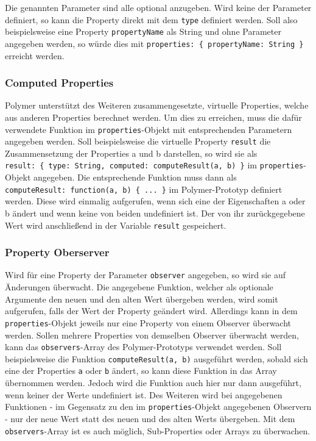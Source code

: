 \documentclass[]{article}
\begin{document}
Die genannten Parameter sind alle optional anzugeben. Wird keine der
Parameter definiert, so kann die Property direkt mit dem \texttt{type}
definiert werden. Soll also beispielsweise eine Property
\texttt{propertyName} als String und ohne Parameter angegeben werden, so
würde dies mit \texttt{properties:\ \{\ propertyName:\ String\ \}}
erreicht werden.

\subsubsection{Computed Properties}\label{computed-properties}

Polymer unterstützt des Weiteren zusammengesetzte, virtuelle Properties,
welche aus anderen Properties berechnet werden. Um dies zu erreichen,
muss die dafür verwendete Funktion im \texttt{properties}-Objekt mit
entsprechenden Parametern angegeben werden. Soll beispielsweise die
virtuelle Property \texttt{result} die Zusammensetzung der Properties a
und b darstellen, so wird sie als
\texttt{result:\ \{\ type:\ String,\ computed:\ computeResult(a,\ b)\ \}}
im \texttt{properties}-Objekt angegeben. Die entsprechende Funktion muss
dann als \texttt{computeResult:\ function(a,\ b)\ \{\ ...\ \}} im
Polymer-Prototyp definiert werden. Diese wird einmalig aufgerufen, wenn
sich eine der Eigenschaften a oder b ändert und wenn keine von beiden
undefiniert ist. Der von ihr zurückgegebene Wert wird anschließend in
der Variable \texttt{result} gespeichert.

\subsubsection{Property Oberserver}\label{property-oberserver}

Wird für eine Property der Parameter \texttt{observer} angegeben, so
wird sie auf Änderungen überwacht. Die angegebene Funktion, welcher als
optionale Argumente den neuen und den alten Wert übergeben werden, wird
somit aufgerufen, falls der Wert der Property geändert wird. Allerdings
kann in dem \texttt{properties}-Objekt jeweils nur eine Property von
einem Observer überwacht werden. Sollen mehrere Properties von demselben
Observer überwacht werden, kann das \texttt{observers}-Array des
Polymer-Prototyps verwendet werden. Soll beispielsweise die Funktion
\texttt{computeResult(a,\ b)} ausgeführt werden, sobald sich eine der
Properties \texttt{a} oder \texttt{b} ändert, so kann diese Funktion in
das Array übernommen werden. Jedoch wird die Funktion auch hier nur dann
ausgeführt, wenn keiner der Werte undefiniert ist. Des Weiteren wird bei
angegebenen Funktionen - im Gegensatz zu den im
\texttt{properties}-Objekt angegebenen Observern - nur der neue Wert
statt des neuen und des alten Werts übergeben. Mit dem
\texttt{observers}-Array ist es auch möglich, Sub-Properties oder Arrays
zu überwachen.
\end{document}
